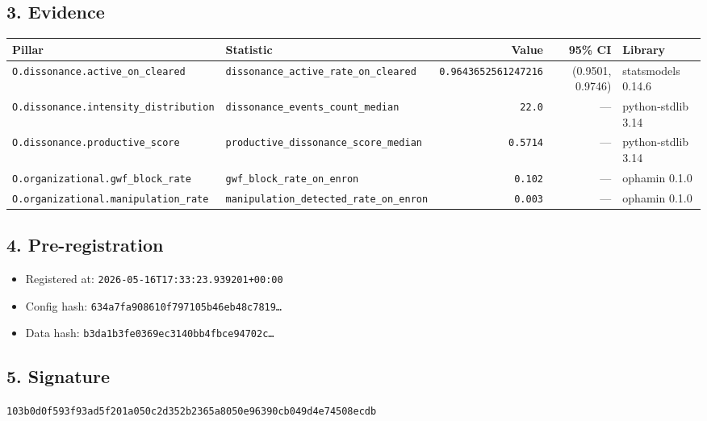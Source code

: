 \documentclass{article}
\begin{document}
\subsection*{3. Evidence}
\begin{tabular}{llrrl}\toprule
\textbf{Pillar} & \textbf{Statistic} & \textbf{Value} & \textbf{95\% CI} & \textbf{Library} \\\midrule
\texttt{O.dissonance.active\_on\_cleared} & \texttt{dissonance\_active\_rate\_on\_cleared} & \texttt{0.9643652561247216} & (0.9501, 0.9746) & statsmodels 0.14.6 \\
\texttt{O.dissonance.intensity\_distribution} & \texttt{dissonance\_events\_count\_median} & \texttt{22.0} & --- & python-stdlib 3.14 \\
\texttt{O.dissonance.productive\_score} & \texttt{productive\_dissonance\_score\_median} & \texttt{0.5714} & --- & python-stdlib 3.14 \\
\texttt{O.organizational.gwf\_block\_rate} & \texttt{gwf\_block\_rate\_on\_enron} & \texttt{0.102} & --- & ophamin 0.1.0 \\
\texttt{O.organizational.manipulation\_rate} & \texttt{manipulation\_detected\_rate\_on\_enron} & \texttt{0.003} & --- & ophamin 0.1.0 \\
\bottomrule\end{tabular}
\subsection*{4. Pre-registration}
\begin{itemize}
\item Registered at: \texttt{2026-05-16T17:33:23.939201+00:00}
\item Config hash: \texttt{634a7fa908610f797105b46eb48c7819\dots}
\item Data hash: \texttt{b3da1b3fe0369ec3140bb4fbce94702c\dots}
\end{itemize}
\subsection*{5. Signature}
\texttt{103b0d0f593f93ad5f201a050c2d352b2365a8050e96390cb049d4e74508ecdb}\\
\end{document}

